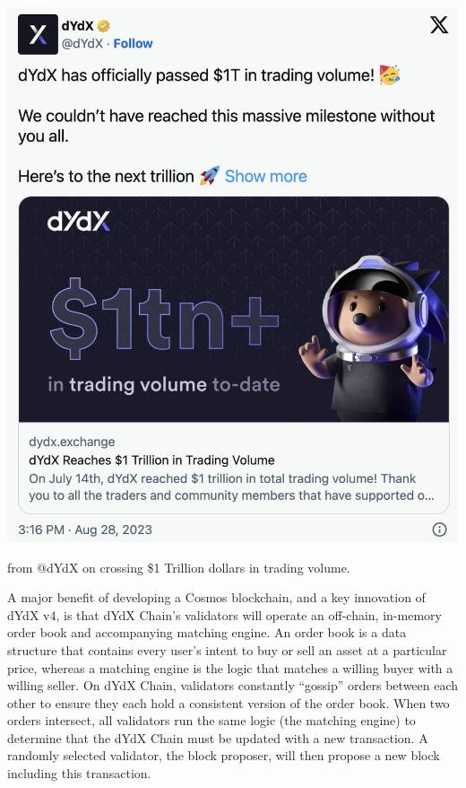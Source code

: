         \begin{marginfigure}
            \centering
            \includegraphics[width=\linewidth]{figs/trading_vol_tweet.png}
            \caption{  from @dYdX on crossing \$1 Trillion dollars in trading volume.}
            \label{fig:trading_vol_tweet}
        \end{marginfigure}
        
        A major benefit of developing a Cosmos blockchain, and a key innovation of dYdX v4, is that dYdX Chain's validators will operate an off-chain, in-memory order book and accompanying matching engine. An order book is a data structure that contains every user's intent to buy or sell an asset at a particular price, whereas a matching engine is the logic that matches a willing buyer with a willing seller. On dYdX Chain, validators constantly ``gossip'' orders between each other to ensure they each hold a consistent version of the order book. When two orders intersect, all validators run the same logic (the matching engine) to determine that the dYdX Chain must be updated with a new transaction. A randomly selected validator, the block proposer, will then propose a new block including this transaction. 
        
